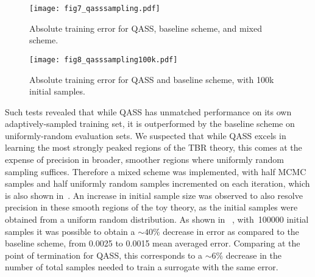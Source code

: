 \begin{figure}
	\centering
	\hspace*{-1.5em}\texttt{[image: fig7\_qasssampling.pdf]}
	\caption{\label{fig:qasssampling}Absolute training error for QASS, baseline scheme, and mixed scheme.}
\end{figure}

\begin{figure}
	\centering
	\hspace*{-1.5em}\texttt{[image: fig8\_qasssampling100k.pdf]}
	\caption{\label{fig:qasssampling100k}Absolute training error for QASS and baseline scheme, with 100k initial samples.}
\end{figure}

Such tests revealed that while QASS has unmatched performance on its own
adaptively-sampled training set, it is outperformed by the baseline scheme on
uniformly-random evaluation sets. We suspected that while QASS excels in
learning the most strongly peaked regions of the TBR theory, this comes at the
expense of precision in broader, smoother regions where uniformly random
sampling suffices. Therefore a mixed scheme was implemented, with half MCMC
samples and half uniformly random samples incremented on each iteration, which
is also shown in~. An increase in initial sample size was
observed to also resolve precision in these smooth regions of the toy theory, as
the initial samples were obtained from a uniform random distribution. As shown
in ~, with~\num{100000} initial samples it was
possible to obtain a ${\sim}40\%$ decrease in error as compared to the baseline
scheme, from 0.0025 to 0.0015 mean averaged error. Comparing at the point of
termination for QASS, this corresponds to a ${\sim}6\%$ decrease in the number
of total samples needed to train a surrogate with the same error. 


